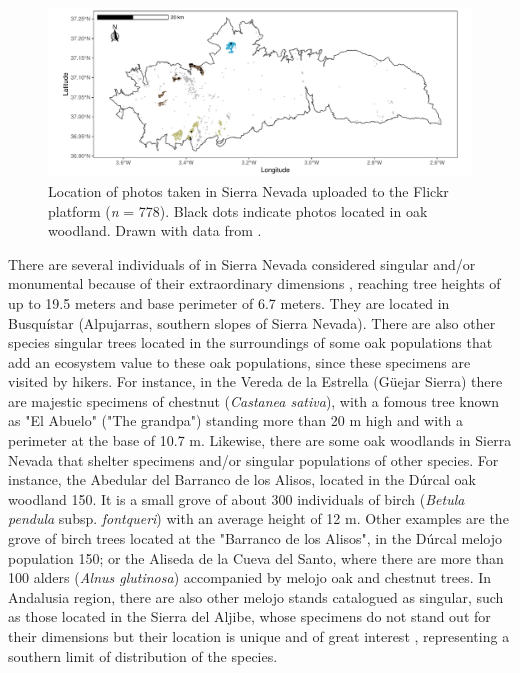 \begin{figure}
    \centering
    \includegraphics[width=\textwidth]{img/es/es-flicker.pdf}\caption{Location of photos taken in Sierra Nevada uploaded to the Flickr platform (\emph{n} = 778). Black dots indicate photos located in oak woodland. Drawn with data from \citet{RosCandeiraetal2020SocialMedia}. 
}\label{fig:es:flicker}
\end{figure}
 
There are several individuals of \Qp in Sierra Nevada considered singular and/or monumental because of their extraordinary dimensions \autocite{IruritaFernandezetal2003ArbolesArboledas}, reaching tree heights of up to 19.5 meters and base perimeter of 6.7 meters. They are located in Busquístar (Alpujarras, southern slopes of Sierra Nevada). There are also other species singular trees located in the surroundings of some oak populations that add an ecosystem value to these oak populations, since these specimens are visited by hikers. For instance, in the Vereda de la Estrella (Güejar Sierra) there are majestic specimens of chestnut (\emph{Castanea sativa}), with a fomous tree known as "El Abuelo" ("The grandpa") standing more than 20 m high and with a perimeter at the base of 10.7 m. Likewise, there are some oak woodlands in Sierra Nevada that shelter specimens and/or singular populations of other species. For instance, the Abedular del Barranco de los Alisos, located in the Dúrcal oak woodland 150. It is a small grove of about 300 individuals of birch (\emph{Betula pendula} subsp. \emph{fontqueri}) with an average height of 12 m. Other examples are the grove of birch trees located at the "Barranco de los Alisos", in the Dúrcal melojo population 150; or the Aliseda de la Cueva del Santo, where there are more than 100 alders (\emph{Alnus glutinosa}) accompanied by melojo oak and chestnut trees. In Andalusia region, there are also other melojo stands catalogued as singular, such as those located in the Sierra del Aljibe, whose specimens do not stand out for their dimensions but their location is unique and of great interest \autocite{SanchezGarciaetal2003ArbolesArboledas}, representing a southern limit of distribution of the species.

